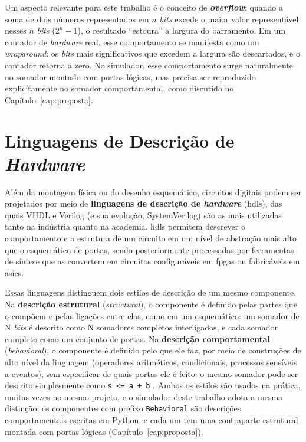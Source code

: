 Um aspecto relevante para este trabalho é o conceito de \textbf{\textit{overflow}}: quando a soma de dois números representados em $n$ \textit{bits} excede o maior valor representável nesses $n$ \textit{bits} ($2^n - 1$), o resultado ``estoura'' a largura do barramento. Em um contador de \textit{hardware} real, esse comportamento se manifesta como um \textit{wraparound}: os \textit{bits} mais significativos que excedem a largura são descartados, e o contador retorna a zero. No simulador, esse comportamento surge naturalmente no somador montado com portas lógicas, mas precisa ser reproduzido explicitamente no somador comportamental, como discutido no Capítulo~\ref{cap:proposta}.

\section{Linguagens de Descrição de \textit{Hardware}}
\label{sec:hdls}

Além da montagem física ou do desenho esquemático, circuitos digitais podem ser projetados por meio de \textbf{linguagens de descrição de \textit{hardware}} (\glspl{hdl}), das quais VHDL e Verilog (e sua evolução, SystemVerilog) são as mais utilizadas tanto na indústria quanto na academia. \Glspl{hdl} permitem descrever o comportamento e a estrutura de um circuito em um nível de abstração mais alto que o esquemático de portas, sendo posteriormente processadas por ferramentas de síntese que as convertem em circuitos configuráveis em \glspl{fpga} ou fabricáveis em \glspl{asic}.

Essas linguagens distinguem dois estilos de descrição de um mesmo componente. Na \textbf{descrição estrutural} (\textit{structural}), o componente é definido pelas partes que o compõem e pelas ligações entre elas, como em um esquemático: um somador de N \textit{bits} é descrito como N somadores completos interligados, e cada somador completo como um conjunto de portas. Na \textbf{descrição comportamental} (\textit{behavioral}), o componente é definido pelo que ele faz, por meio de construções de alto nível da linguagem (operadores aritméticos, condicionais, processos sensíveis a eventos), sem especificar de quais portas ele é feito: o mesmo somador pode ser descrito simplesmente como \texttt{s <= a + b} \cite{ashenden2008}. Ambos os estilos são usados na prática, muitas vezes no mesmo projeto, e o simulador deste trabalho adota a mesma distinção: os componentes com prefixo \texttt{Behavioral} são descrições comportamentais escritas em Python, e cada um tem uma contraparte estrutural montada com portas lógicas (Capítulo~\ref{cap:proposta}).

